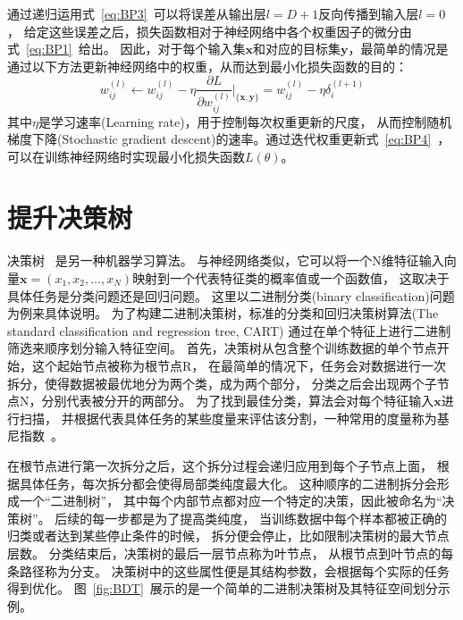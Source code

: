 通过递归运用式~\ref{eq:BP3}~可以将误差从输出层$l=D+1$反向传播到输入层$l=0$，
给定这些误差之后，损失函数相对于神经网络中各个权重因子的微分由式~\ref{eq:BP1}~给出。
因此，对于每个输入集$\boldsymbol{x}$和对应的目标集$\boldsymbol{y}$，最简单的情况是通过以下方法更新神经网络中的权重，从而达到最小化损失函数的目的：
\begin{equation} 
\label{eq:BP4}	
w_{ij}^{(l)} \leftarrow w_{ij}^{(l)} - \eta \frac{\partial L}{\partial w_{ij}^{(l)}} \bigg\rvert_{\{\boldsymbol{x},\boldsymbol{y}\}} = w_{ij}^{(l)} - \eta \delta_{i}^{(l+1)}
\end{equation}
其中$\eta$是学习速率(Learning rate)，用于控制每次权重更新的尺度，
从而控制随机梯度下降(Stochastic gradient descent)的速率。通过迭代权重更新式~\ref{eq:BP4}~，
可以在训练神经网络时实现最小化损失函数$L(\theta)$。


\section{提升决策树}
\label{sec:BDT}

决策树
~\cite{BDT2,BDT1}是另一种机器学习算法。
与神经网络类似，它可以将一个N维特征输入向量$\boldsymbol{x}=(x_1,x_2,	\dots,x_N)$映射到一个代表特征类的概率值或一个函数值，
这取决于具体任务是分类问题还是回归问题。
这里以二进制分类(binary classification)问题为例来具体说明。
为了构建二进制决策树，标准的分类和回归决策树算法(The standard classification and regression tree, CART)
通过在单个特征上进行二进制筛选来顺序划分输入特征空间。
首先，决策树从包含整个训练数据的单个节点开始，这个起始节点被称为根节点R，
在最简单的情况下，任务会对数据进行一次拆分，使得数据被最优地分为两个类，成为两个部分，
分类之后会出现两个子节点N，分别代表被分开的两部分。
为了找到最佳分类，算法会对每个特征输入$\boldsymbol{x}$进行扫描，
并根据代表具体任务的某些度量来评估该分割，一种常用的度量称为基尼指数~\cite{BDT1}。

在根节点进行第一次拆分之后，这个拆分过程会递归应用到每个子节点上面，
根据具体任务，每次拆分都会使得局部类纯度最大化。
这种顺序的二进制拆分会形成一个“二进制树”，
其中每个内部节点都对应一个特定的决策，因此被命名为“决策树”。
后续的每一步都是为了提高类纯度，
当训练数据中每个样本都被正确的归类或者达到某些停止条件的时候，
拆分便会停止，比如限制决策树的最大节点层数。
分类结束后，决策树的最后一层节点称为叶节点，
从根节点到叶节点的每条路径称为分支。
决策树中的这些属性便是其结构参数，会根据每个实际的任务得到优化。
图~\ref{fig:BDT}~展示的是一个简单的二进制决策树及其特征空间划分示例。

